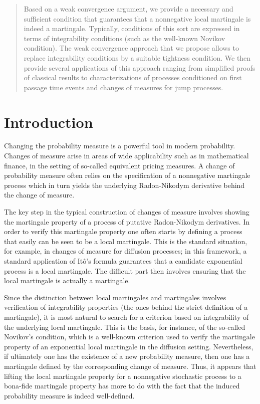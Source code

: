 \begin{abstract}
Based on a weak convergence argument, we provide a necessary and sufficient
condition that guarantees that a nonnegative local martingale is indeed a
martingale. Typically, conditions of this sort are expressed in terms of
integrability conditions (such as the well-known Novikov condition). The
weak convergence approach that we propose allows to replace integrability
conditions by a suitable tightness condition. We then provide several
applications of this approach ranging from simplified proofs of classical
results to characterizations of processes conditioned on first passage time
events and changes of measures for jump processes.
\end{abstract}



\section{Introduction}

Changing the probability measure is a powerful tool in modern probability.
Changes of measure arise in areas of wide applicability such as in
mathematical finance, in the setting of so-called equivalent pricing
measures. A change of probability measure often relies on the specification
of a nonnegative martingale process which in turn yields the underlying
Radon-Nikodym derivative behind the change of measure.

The key step in the typical construction of changes of measure involves
showing the martingale property of a process of putative Radon-Nikodym
derivatives. In order to verify this martingale property one often starts by
defining a process that easily can be seen to be a local martingale. This is
the standard situation, for example, in changes of measure for diffusion
processes; in this framework, a standard application of It\^{o}'s formula
guarantees that a candidate exponential process is a local martingale. The
difficult part then involves ensuring that the local martingale is actually
a martingale.

Since the distinction between local martingales and martingales involves
verification of integrability properties (the ones behind the strict
definition of a martingale), it is most natural to search for a criterion
based on integrability of the underlying local martingale. This is the
basis, for instance, of the so-called Novikov's condition, which is a
well-known criterion used to verify the martingale property of an
exponential local martingale in the diffusion setting. Nevertheless, if
ultimately one has the existence of a new probability measure, then one has
a martingale defined by the corresponding change of measure. Thus, it
appears that lifting the local martingale property for a nonnegative
stochastic process to a bona-fide martingale property has more to do with
the fact that the induced probability measure is indeed well-defined.

